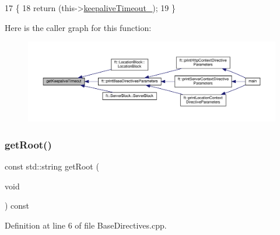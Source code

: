 \begin{DoxyCode}
17     \{
18         \textcolor{keywordflow}{return} (this->\hyperlink{classft_1_1_base_directives_aa1f5f394b428d0d18765a9b9e14e648f}{keepaliveTimeout\_});
19     \}
\end{DoxyCode}
Here is the caller graph for this function\+:
\nopagebreak
\begin{figure}[H]
\begin{center}
\leavevmode
\includegraphics[width=350pt]{classft_1_1_base_directives_ab8574338758f65325cab5d1c394826c8_icgraph}
\end{center}
\end{figure}
\mbox{\label{classft_1_1_base_directives_aa5dbcb08bda0a0e7e502d2df7cf64287}} 
\subsubsection{\texorpdfstring{get\+Root()}{getRoot()}}
{\footnotesize\ttfamily const std\+::string get\+Root (\begin{DoxyParamCaption}\item[{void}]{ }\end{DoxyParamCaption}) const}



Definition at line 6 of file Base\+Directives.\+cpp.


